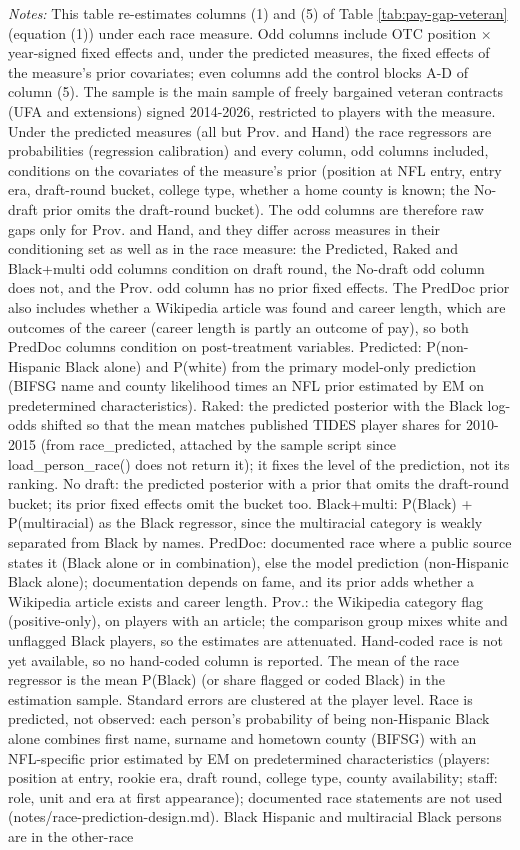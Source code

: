 {\footnotesize
\noindent\textit{Notes:} This table re-estimates columns (1) and (5) of Table \ref{tab:pay-gap-veteran} (equation (1)) under each race measure. Odd columns include OTC position $\times$ year-signed fixed effects and, under the predicted measures, the fixed effects of the measure's prior covariates; even columns add the control blocks A-D of column (5). The sample is the main sample of freely bargained veteran contracts (UFA and extensions) signed 2014-2026, restricted to players with the measure. Under the predicted measures (all but Prov. and Hand) the race regressors are probabilities (regression calibration) and every column, odd columns included, conditions on the covariates of the measure's prior (position at NFL entry, entry era, draft-round bucket, college type, whether a home county is known; the No-draft prior omits the draft-round bucket). The odd columns are therefore raw gaps only for Prov. and Hand, and they differ across measures in their conditioning set as well as in the race measure: the Predicted, Raked and Black+multi odd columns condition on draft round, the No-draft odd column does not, and the Prov. odd column has no prior fixed effects. The PredDoc prior also includes whether a Wikipedia article was found and career length, which are outcomes of the career (career length is partly an outcome of pay), so both PredDoc columns condition on post-treatment variables. Predicted: P(non-Hispanic Black alone) and P(white) from the primary model-only prediction (BIFSG name and county likelihood times an NFL prior estimated by EM on predetermined characteristics). Raked: the predicted posterior with the Black log-odds shifted so that the mean matches published TIDES player shares for 2010-2015 (from race\_predicted, attached by the sample script since load\_person\_race() does not return it); it fixes the level of the prediction, not its ranking. No draft: the predicted posterior with a prior that omits the draft-round bucket; its prior fixed effects omit the bucket too. Black+multi: P(Black) + P(multiracial) as the Black regressor, since the multiracial category is weakly separated from Black by names. PredDoc: documented race where a public source states it (Black alone or in combination), else the model prediction (non-Hispanic Black alone); documentation depends on fame, and its prior adds whether a Wikipedia article exists and career length. Prov.: the Wikipedia category flag (positive-only), on players with an article; the comparison group mixes white and unflagged Black players, so the estimates are attenuated. Hand-coded race is not yet available, so no hand-coded column is reported. The mean of the race regressor is the mean P(Black) (or share flagged or coded Black) in the estimation sample. Standard errors are clustered at the player level. Race is predicted, not observed: each person's probability of being non-Hispanic Black alone combines first name, surname and hometown county (BIFSG) with an NFL-specific prior estimated by EM on predetermined characteristics (players: position at entry, rookie era, draft round, college type, county availability; staff: role, unit and era at first appearance); documented race statements are not used (notes/race-prediction-design.md). Black Hispanic and multiracial Black persons are in the other-race }
